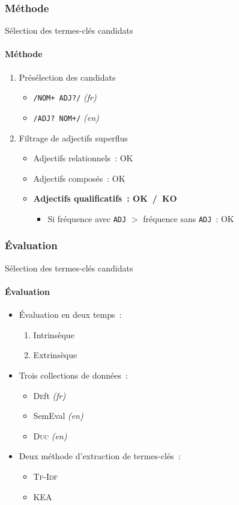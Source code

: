 \subsubsection{Méthode}
  \begin{frame}{Sélection des termes-clés candidats}\framesubtitle{Méthode}
    \begin{enumerate}
      \item<+->{Présélection des candidats}
      \begin{itemize}
        \item{\texttt{/NOM+ ADJ?/} \textit{(fr)}}
        \item{\texttt{/ADJ? NOM+/} \textit{(en)}}
      \end{itemize}
      \item<+->{Filtrage de adjectifs superflus}
      \begin{itemize}
        \item<+->{Adjectifs relationnels~: OK}
        \item<+->{Adjectifs composés~: OK}
        \item<+->{\textbf{Adjectifs qualificatifs~: OK~/~KO}}
        \begin{itemize}
          \item<+->{Si fréquence avec \texttt{ADJ} $>$ fréquence sans
                    \texttt{ADJ}~: OK}
        \end{itemize}
      \end{itemize}
    \end{enumerate}
  \end{frame}

\subsubsection{Évaluation}
  \begin{frame}{Sélection des termes-clés candidats}\framesubtitle{Évaluation}
    \begin{itemize}
      \item<+->{Évaluation en deux temps~:}
      \begin{enumerate}
        \item{Intrinsèque}
        \item{Extrinsèque}
      \end{enumerate}
      \item<+->{Trois collections de données~:}
      \begin{itemize}
        \item{\textsc{De}ft \textit{(fr)}}
        \item{SemEval \textit{(en)}}
        \item{\textsc{Duc} \textit{(en)}}
      \end{itemize}
      \item<+->{Deux méthode d'extraction de termes-clés~:}
      \begin{itemize}
        \item{\textsc{Tf-Idf}}
        \item{KEA}
      \end{itemize}
    \end{itemize}
  \end{frame}

